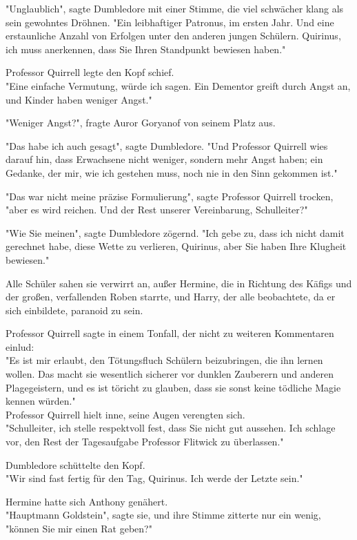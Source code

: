 {"Unglaublich", sagte Dumbledore mit einer Stimme, die viel schwächer klang als sein gewohntes Dröhnen. "Ein leibhaftiger Patronus, im ersten Jahr. Und eine erstaunliche Anzahl von Erfolgen unter den anderen jungen Schülern. Quirinus, ich muss anerkennen, dass Sie Ihren Standpunkt bewiesen haben."

Professor Quirrell legte den Kopf schief.\\ "Eine einfache Vermutung, würde ich sagen. Ein Dementor greift durch Angst an, und Kinder haben weniger Angst."

"Weniger Angst?", fragte Auror Goryanof von seinem Platz aus.

"Das habe ich auch gesagt", sagte Dumbledore. "Und Professor Quirrell wies darauf hin, dass Erwachsene nicht weniger, sondern mehr Angst haben; ein Gedanke, der mir, wie ich gestehen muss, noch nie in den Sinn gekommen ist."

"Das war nicht meine präzise Formulierung", sagte Professor Quirrell trocken, "aber es wird reichen. Und der Rest unserer Vereinbarung, Schulleiter?"

"Wie Sie meinen", sagte Dumbledore zögernd. "Ich gebe zu, dass ich nicht damit gerechnet habe, diese Wette zu verlieren, Quirinus, aber Sie haben Ihre Klugheit bewiesen."

Alle Schüler sahen sie verwirrt an, außer Hermine, die in Richtung des Käfigs und der großen, verfallenden Roben starrte, und Harry, der alle beobachtete, da er sich einbildete, paranoid zu sein.

Professor Quirrell sagte in einem Tonfall, der nicht zu weiteren Kommentaren einlud:\\ "Es ist mir erlaubt, den Tötungsfluch Schülern beizubringen, die ihn lernen wollen. Das macht sie wesentlich sicherer vor dunklen Zauberern und anderen Plagegeistern, und es ist töricht zu glauben, dass sie sonst keine tödliche Magie kennen würden."\\ Professor Quirrell hielt inne, seine Augen verengten sich.\\ "Schulleiter, ich stelle respektvoll fest, dass Sie nicht gut aussehen. Ich schlage vor, den Rest der Tagesaufgabe Professor Flitwick zu überlassen."

Dumbledore schüttelte den Kopf.\\ "Wir sind fast fertig für den Tag, Quirinus. Ich werde der Letzte sein."

Hermine hatte sich Anthony genähert.\\ "Hauptmann Goldstein", sagte sie, und ihre Stimme zitterte nur ein wenig, "können Sie mir einen Rat geben?"

}

